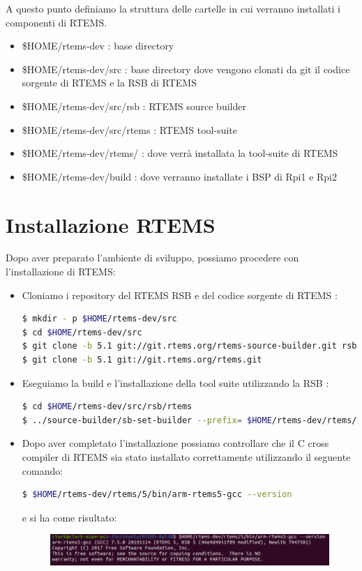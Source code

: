 \documentclass[10pt, a4paper]{article}
\begin{document}
\begin{flushleft}
A questo punto definiamo la struttura delle cartelle in cui verranno installati i componenti di RTEMS.

\begin{itemize}
\item \$HOME/rtems-dev  : base directory
\item \$HOME/rtems-dev/src : base directory dove vengono clonati da git il codice sorgente di RTEMS e la RSB di RTEMS
\item \$HOME/rtems-dev/src/rsb : RTEMS source builder
\item \$HOME/rtems-dev/src/rtems : RTEMS tool-suite
\item \$HOME/rtems-dev/rtems/ : dove verrà installata la tool-suite di RTEMS 
\item \$HOME/rtems-dev/build : dove verranno installate i BSP di Rpi1 e Rpi2
\end{itemize}
\newpage
\section{Installazione RTEMS}

Dopo aver preparato l'ambiente di sviluppo, possiamo procedere con l'installazione di RTEMS:
\begin{itemize}

\item Cloniamo i repository del RTEMS RSB e del codice sorgente di RTEMS : 
\begin{lstlisting}[language=bash] 
$ mkdir - p $HOME/rtems-dev/src
$ cd $HOME/rtems-dev/src
$ git clone -b 5.1 git://git.rtems.org/rtems-source-builder.git rsb
$ git clone -b 5.1 git://git.rtems.org/rtems.git
\end{lstlisting}

\item Eseguiamo la build e l'installazione della tool suite utilizzando la RSB :
\begin{lstlisting}[language=bash] 
$ cd $HOME/rtems-dev/src/rsb/rtems
$ ../source-builder/sb-set-builder --prefix= $HOME/rtems-dev/rtems/5 5/rtems-arm
\end{lstlisting}

\item Dopo aver completato l'installazione possiamo controllare che il C cross compiler di RTEMS sia stato installato correttamente utilizzando il seguente comando: 
\begin{lstlisting}[language=bash] 
$ $HOME/rtems-dev/rtems/5/bin/arm-rtems5-gcc --version
\end{lstlisting}	
e si ha come risultato:
\begin{figure}[h!]
\includegraphics[width=\linewidth]{rtems-gcc-version.png}
\end{figure}


\end{itemize}
\end{flushleft}
\end{document}
